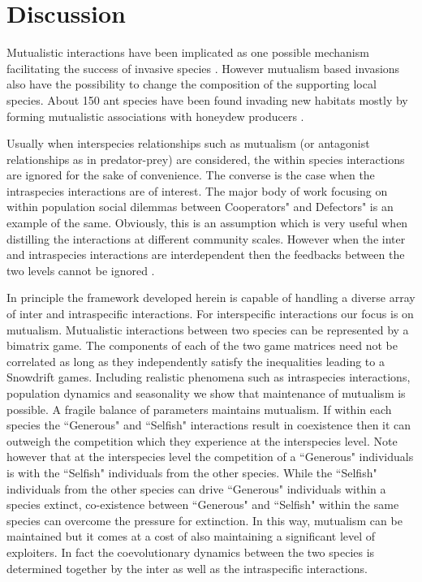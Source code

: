 \documentclass[12pt]{article}
\begin{document}
\section{Discussion}

Mutualistic interactions have been implicated as one possible mechanism facilitating the success of invasive species \citep{richardson:BR:2000}.
However mutualism based invasions also have the possibility to change the composition of the supporting local species.
About 150 ant species have been found invading new habitats mostly by forming mutualistic associations with honeydew producers \citep{mcglynn:JB:1999}.

Usually when interspecies relationships such as mutualism (or antagonist relationships as in predator-prey) are considered, the within species interactions are ignored for the sake of convenience.
The converse is the case when the intraspecies interactions are of interest.
The major body of work focusing on within population social dilemmas between Cooperators" and Defectors" is an example of the same.
Obviously, this is an assumption which is very useful when distilling the interactions at different community scales.
However when the inter and intraspecies interactions are interdependent then the feedbacks between the two levels cannot be ignored \citep{schluter:PlosB:2012}.

In principle the framework developed herein is capable of handling a diverse array of inter and intraspecific interactions.
For interspecific interactions our focus is on mutualism.
Mutualistic interactions between two species can be represented by a bimatrix game.
The components of each of the two game matrices need not be correlated as long as they independently satisfy the inequalities leading to a Snowdrift games. 
Including realistic phenomena such as intraspecies interactions, population dynamics and seasonality we show that maintenance of mutualism is possible.
A fragile balance of parameters maintains mutualism. 
If within each species the ``Generous" and ``Selfish" interactions result in coexistence then it can outweigh the competition which they experience at the interspecies level.
Note however that at the interspecies level the competition of a ``Generous" individuals is with the ``Selfish" individuals from the other species. 
While the ``Selfish" individuals from the other species can drive ``Generous" individuals within a species extinct, co-existence between ``Generous" and ``Selfish" within the same species can overcome the pressure for extinction. 
In this way, mutualism can be maintained but it comes at a cost of also maintaining a significant level of exploiters. 
In fact the coevolutionary dynamics between the two species is determined together by the inter as well as the intraspecific interactions.
\end{document}

